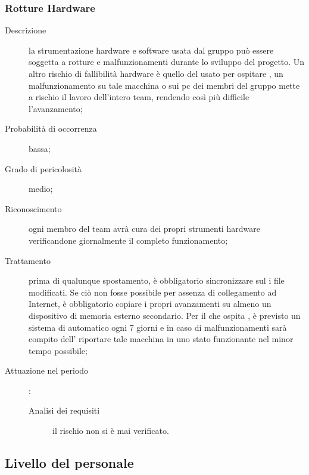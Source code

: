 		\subsubsection{Rotture Hardware}
		\begin{description}
			\item[Descrizione] la strumentazione hardware e software usata dal gruppo può essere soggetta a rotture e malfunzionamenti durante lo sviluppo del progetto. Un altro rischio di fallibilità hardware è quello del  usato per ospitare , un malfunzionamento su tale macchina o sui pc dei membri del gruppo mette a rischio il lavoro dell'intero team, rendendo così più difficile l'avanzamento;
			\item[Probabilità di occorrenza] bassa;
			\item[Grado di pericolosità] medio;
			\item[Riconoscimento] ogni membro del team avrà cura dei propri strumenti hardware verificandone giornalmente il completo funzionamento;
			\item[Trattamento] prima di qualunque spostamento, è obbligatorio sincronizzare sul   i file modificati. Se ciò non fosse possibile per assenza di collegamento ad Internet, è obbligatorio copiare i propri avanzamenti su almeno un dispositivo di memoria esterno secondario. Per il  che ospita , è previsto un sistema di  automatico ogni 7 giorni e in caso di malfunzionamenti sarà compito dell’\AM{} riportare tale macchina in uno stato funzionante nel minor tempo possibile; 
			\item[Attuazione nel periodo]:
			\begin{description}
				\item[Analisi dei requisiti] il rischio non si è mai verificato.
			\end{description}
		\end{description}
	\subsection{Livello del personale} \label{sec:per}
